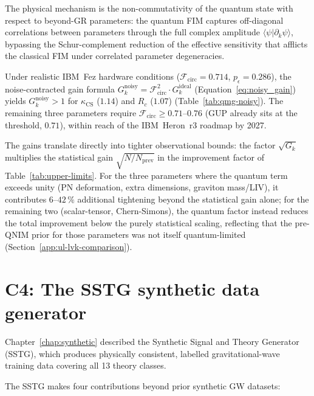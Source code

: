 \documentclass[11pt,a4paper, english]{book}
\theoremstyle{plain}
\theoremstyle{definition}
\numberwithin{equation}{chapter}
\numberwithin{figure}{chapter}
\numberwithin{table}{chapter}
\begin{document}
The physical mechanism is the non-commutativity of the quantum state with
respect to beyond-GR parameters: the quantum FIM captures off-diagonal
correlations between parameters through the full complex amplitude
$\langle\psi|\partial_k\psi\rangle$, bypassing the Schur-complement
reduction of the effective sensitivity that afflicts the classical FIM
under correlated parameter degeneracies.

Under realistic IBM~Fez hardware conditions
($\mathcal{F}_\mathrm{circ} = 0.714$, $p_\epsilon = 0.286$), the
noise-contracted gain formula
$G_k^\mathrm{noisy} = \mathcal{F}_\mathrm{circ}^2 \cdot G_k^\mathrm{ideal}$
(Equation~\ref{eq:noisy_gain}) yields $G_k^\mathrm{noisy} > 1$ for
$\kappa_\mathrm{CS}$ ($1.14$) and $R_c$ ($1.07$)
(Table~\ref{tab:qmg-noisy}).  The remaining three parameters require
$\mathcal{F}_\mathrm{circ} \geq 0.71$--$0.76$ (GUP already sits at the
threshold, $0.71$), within reach of the IBM~Heron~r3 roadmap by 2027.

The gains translate directly into tighter observational bounds: the factor
$\sqrt{G_k}$ multiplies the statistical gain $\sqrt{N/N_\mathrm{prev}}$
in the improvement factor of Table~\ref{tab:upper-limits}. For the three
parameters where the quantum term exceeds unity (PN deformation, extra
dimensions, graviton mass/LIV), it contributes $6$--$42\,\%$ additional
tightening beyond the statistical gain alone; for the remaining two
(scalar-tensor, Chern-Simons), the quantum factor instead reduces the
total improvement below the purely statistical scaling, reflecting that
the pre-QNIM prior for those parameters was not itself quantum-limited
(Section~\ref{app:ul-lvk-comparison}).

\section{C4: The SSTG synthetic data generator}
\label{app:contrib4}

Chapter~\ref{chap:synthetic} described the Synthetic Signal and Theory
Generator (SSTG), which produces physically consistent, labelled
gravitational-wave training data covering all 13 theory classes.

The SSTG makes four contributions beyond prior synthetic GW datasets:
\end{document}
